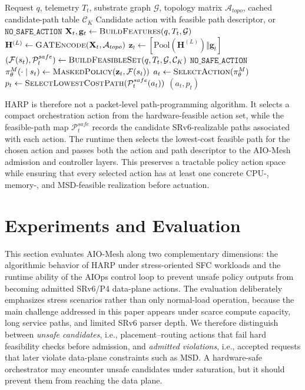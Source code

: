 \documentclass[final,5p]{elsarticle}
\begin{document}
\begin{algorithm}[t]
\caption{HARP decision procedure}
\label{alg:harp_decision}
\begin{algorithmic}[1]
\Require Request \(q\), telemetry \(T_t\), substrate graph \(\mathcal{G}\), topology matrix \(\mathcal{A}_{topo}\), cached candidate-path table \(\mathcal{C}_K\)
\Ensure Candidate action with feasible path descriptor, or \(\texttt{NO\_SAFE\_ACTION}\)
\State \(\mathbf{X}_t, \mathbf{g}_t \gets \textsc{BuildFeatures}(q,T_t,\mathcal{G})\)
\State \(\mathbf{H}^{(L)} \gets \textsc{GATEncode}(\mathbf{X}_t,\mathcal{A}_{topo})\)
\State \(\mathbf{z}_t \gets [\mathrm{Pool}(\mathbf{H}^{(L)}) \Vert \mathbf{g}_t]\)
\State \((\mathcal{F}(s_t), \mathcal{P}^{safe}_t) \gets \textsc{BuildFeasibleSet}(q,T_t,\mathcal{G},\mathcal{C}_K)\)
    \State \Return \(\texttt{NO\_SAFE\_ACTION}\)
\EndIf
\State \(\pi_{\theta}^{M}(\cdot \mid s_t) \gets \textsc{MaskedPolicy}(\mathbf{z}_t,\mathcal{F}(s_t))\)
\State \(a_t \gets \textsc{SelectAction}(\pi_{\theta}^{M})\)
\State \(p_t \gets \textsc{SelectLowestCostPath}(\mathcal{P}^{safe}_t(a_t))\)
\State \Return \((a_t,p_t)\)
\end{algorithmic}
\end{algorithm}

HARP is therefore not a packet-level path-programming algorithm. It selects a compact orchestration action from the hardware-feasible action set, while the feasible-path map \(\mathcal{P}^{safe}_t\) records the candidate SRv6-realizable paths associated with each action. The runtime then selects the lowest-cost feasible path for the chosen action and passes both the action and path descriptor to the AIO-Mesh admission and controller layers. This preserves a tractable policy action space while ensuring that every selected action has at least one concrete CPU-, memory-, and MSD-feasible realization before actuation.


\section{Experiments and Evaluation}
\label{sec:evaluation}

This section evaluates AIO-Mesh along two complementary dimensions: the algorithmic behavior of HARP under stress-oriented SFC workloads and the runtime ability of the AIOps control loop to prevent unsafe policy outputs from becoming admitted SRv6/P4 data-plane actions. The evaluation deliberately emphasizes stress scenarios rather than only normal-load operation, because the main challenge addressed in this paper appears under scarce compute capacity, long service paths, and limited SRv6 parser depth. We therefore distinguish between \textit{unsafe candidates}, i.e., placement--routing actions that fail hard feasibility checks before admission, and \textit{admitted violations}, i.e., accepted requests that later violate data-plane constraints such as MSD. A hardware-safe orchestrator may encounter unsafe candidates under saturation, but it should prevent them from reaching the data plane.
\end{document}
